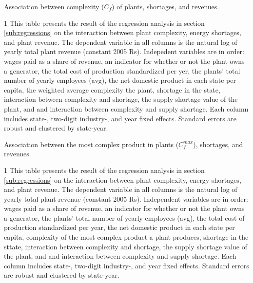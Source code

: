 \documentclass[11pt]{article}
\begin{document}
\begin{sidewaystable}
	\begin{center}
		\begin{threeparttable}
		\caption{Association between complexity ($C_{f}$) of plants, shortages, and revenues.}
			\label{tab:interaction_avg_pci}
			
			\begin{tablenotes} \footnotesize
			\item[1] This table presents the result of the regression analysis in section \ref{sub:regressions} on the interaction between plant complexity, energy shortages, and plant revenue. The dependent variable in all columns is the natural log of yearly total plant revenue (constant 2005 Rs). Indepedent variables are in order: wages paid as a share of revenue, an indicator for whether or not the plant owns a generator, the total cost of production standardized per yer, the plants' total number of yearly employees (avg), the net domestic product in each state per capita, the weighted average complexity the plant, shortage in the state, interaction between complexity and shortage, the supply shortage value of the plant, and and interaction between complexity and supply shortage. Each column includes state-, two-digit industry-, and year fixed effects. Standard errors are robust and clustered by state-year.
			\end{tablenotes}
		\end{threeparttable}
	\end{center}
\end{sidewaystable}


\begin{sidewaystable}
	\begin{center}
		\begin{threeparttable}
		\caption{Association between the most complex product in plants ($C^{max}_{f}$), shortages, and revenues.}
			\label{tab:interaction_max_pci}
			
			\begin{tablenotes} \footnotesize
			\item[1] This table presents the result of the regression analysis in section \ref{sub:regressions} on the interaction between plant complexity, energy shortages, and plant revenue. The dependent variable in all columns is the natural log of yearly total plant revenue (constant 2005 Rs). Independent variables are in order: wages paid as a share of revenue, an indicator for whether or not the plant owns a generator, the plants' total number of yearly employees (avg), the total cost of production standardized per year, the net domestic product in each state per capita, complexity of the most complex product a plant produces, shortage in the sttate, interaction between complexity and shortage, the supply shortage value of the plant, and and interaction between complexity and supply shortage. Each column includes state-, two-digit industry-, and year fixed effects. Standard errors are robust and clustered by state-year.
			\end{tablenotes}
		\end{threeparttable}
	\end{center}
\end{sidewaystable}
\end{document}
